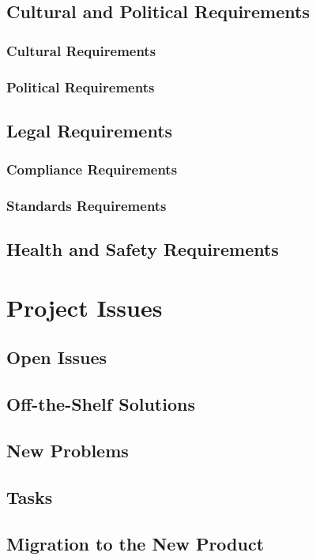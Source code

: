 \documentclass{article}
\begin{document}
\subsection{Cultural and Political Requirements}
    \subsubsection{Cultural Requirements}
    \subsubsection{Political Requirements}    
    
\subsection{Legal Requirements}
    \subsubsection{Compliance Requirements}
    \subsubsection{Standards Requirements}    
\subsection{Health and Safety Requirements}

\section{Project Issues}
\subsection{Open Issues}
\subsection{Off-the-Shelf Solutions}
\subsection{New Problems}
\subsection{Tasks}
\subsection{Migration to the New Product}
\end{document}
